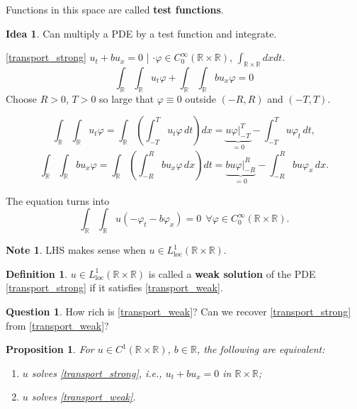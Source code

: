 \documentclass[12pt]{article}
\newtheorem{proposition}{Proposition}[section]
\theoremstyle{definition}
\newtheorem*{definition*}{Definition}
\newtheorem*{note}{Note}
\newtheorem*{idea}{Idea}
\newtheorem*{question}{Question}
\begin{document}
Functions in this space are called \textbf{test functions}.

\begin{idea}
Can multiply a PDE by a test function and integrate.
\end{idea}

\eqref{transport_strong} $u_t+bu_x=0$ | $\cdot\varphi\in C_0^{\infty}(\mathbb{R}\times\mathbb{R})$, $\int_{\mathbb{R}\times\mathbb{R}}dxdt$.
\[\int_{\mathbb{R}}\int_{\mathbb{R}}u_t\varphi+\int_{\mathbb{R}}\int_{\mathbb{R}}bu_x\varphi=0\]
Choose $R>0$, $T>0$ so large that $\varphi\equiv0$ outside $(-R,R)$ and $(-T,T)$.

\[\int_{\mathbb{R}}\int_{\mathbb{R}}u_t\varphi=\int_{\mathbb{R}}\left(\int_{-T}^Tu_t\varphi\,dt\right)dx=\underbrace{u\varphi\Big|_{-T}^T}_{=0}-\int_{-T}^Tu\varphi_t\,dt,\]
\[\int_{\mathbb{R}}\int_{\mathbb{R}}bu_x\varphi=\int_{\mathbb{R}}\left(\int_{-R}^Rbu_x\varphi\,dx\right)dt=\underbrace{bu\varphi\Big|_{-R}^R}_{=0}-\int_{-R}^Rbu\varphi_x\,dx.\]

The equation turns into
\begin{equation}\tag{T$'$}\label{transport_weak}
\int_{\mathbb{R}}\int_{\mathbb{R}}u(-\varphi_t-b\varphi_x)=0\ \ \forall\varphi\in C_0^{\infty}(\mathbb{R}\times\mathbb{R}).
\end{equation}

\begin{note}
LHS makes sense when $u\in L_{\text{loc}}^1(\mathbb{R}\times\mathbb{R})$.
\end{note}

\begin{definition*}
$u\in L_{\text{loc}}^1(\mathbb{R}\times\mathbb{R})$ is called a \textbf{weak solution} of the PDE \eqref{transport_strong} if it satisfies \eqref{transport_weak}.
\end{definition*}
\begin{question}How rich is \eqref{transport_weak}? Can we recover \eqref{transport_strong} from \eqref{transport_weak}?
\end{question}

\begin{proposition}\label{transport_weak_equivalence}
For $u\in C^1(\mathbb{R}\times\mathbb{R})$, $b\in\mathbb{R}$, the following are equivalent:
\begin{enumerate}[label=(\roman*)]
\item\label{transport_strong_equivalent} $u$ solves \eqref{transport_strong}, i.e., $u_t+bu_x=0$ in $\mathbb{R}\times\mathbb{R}$;
\item\label{transport_weak_equivalent} $u$ solves \eqref{transport_weak}.
\end{enumerate}
\end{proposition}
\end{document}
